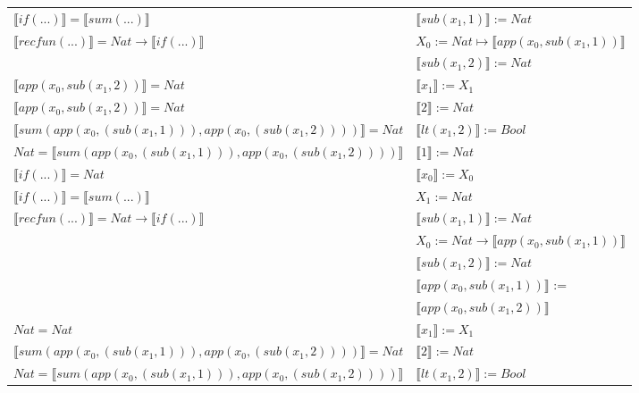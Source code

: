 \begin{exercise}
\begin{description}
\begin{center}
\begin{longtable}[!h]{ | l | l | }
                        $ \llbracket if(...) \rrbracket =  \llbracket sum(...) \rrbracket$ & $\llbracket sub(x_1,1) \rrbracket := Nat$\\ 
                        $ \llbracket recfun(...) \rrbracket =   Nat  \to  \llbracket if(...) \rrbracket $ & $X_0 := Nat \mapsto  \llbracket app(x_0, sub(x_1,1)) \rrbracket$  \\ 
                        & $ \llbracket sub(x_1,2) \rrbracket := Nat$ \\
                    \hline
                        $ \llbracket app(x_0, sub(x_1,2)) \rrbracket = Nat$ &  $ \llbracket x_1 \rrbracket := X_1$\\
                        $ \llbracket app(x_0, sub(x_1,2)) \rrbracket = Nat$ &   $ \llbracket 2 \rrbracket := Nat$\\  
                        $ \llbracket sum(app(x_0, (sub(x_1,1))), app(x_0, (sub(x_1,2))))  \rrbracket = Nat$ & $ \llbracket lt(x_1 , 2) \rrbracket := Bool$\\ 
                        $Nat =  \llbracket sum(app(x_0, (sub(x_1,1))), app(x_0, (sub(x_1,2)))) \rrbracket$ &    $ \llbracket 1 \rrbracket := Nat$\\
                        $ \llbracket if(...) \rrbracket = Nat$ &  $ \llbracket x_0 \rrbracket := X_0$\\ 
                        $ \llbracket if(...) \rrbracket =  \llbracket sum(...) \rrbracket$ &  $X_1 := Nat$\\ 
                        $ \llbracket recfun(...) \rrbracket =   Nat  \to  \llbracket if(...) \rrbracket $ &   $ \llbracket sub(x_1,1) \rrbracket := Nat$\\ 
                        &   $X_0 := Nat \to  \llbracket app(x_0, sub(x_1,1)) \rrbracket$\\ 
                        &  $ \llbracket sub(x_1,2) \rrbracket := Nat$ \\
			     &  $ \llbracket app(x_0, sub(x_1,1)) \rrbracket$ := \\
			     &  $ \llbracket app(x_0, sub(x_1,2)) \rrbracket$\\
                    \hline
                        $ Nat = Nat$ &  $ \llbracket x_1 \rrbracket := X_1$\\   
                        $ \llbracket sum(app(x_0, (sub(x_1,1))), app(x_0, (sub(x_1,2))))  \rrbracket = Nat$ &  $ \llbracket 2 \rrbracket := Nat$\\
                        $Nat =  \llbracket sum(app(x_0, (sub(x_1,1))), app(x_0, (sub(x_1,2)))) \rrbracket$ & $ \llbracket lt(x_1 , 2) \rrbracket := Bool$\\

\end{longtable}
\end{center}
\end{description}
\end{exercise}
